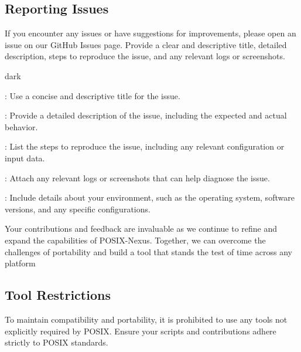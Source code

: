 \subsection{Reporting Issues}
\label{sec:start:sub:report}
If you encounter any issues or have suggestions for improvements, please open an issue on our GitHub Issues page.
Provide a clear and descriptive title, detailed description, steps to reproduce the issue, and any relevant logs or screenshots.
\bigskip
\begin{baseBoxOne}{}{dark}
    \begin{posnexItemize}
        \item[\sA] : Use a concise and descriptive title for the issue.
        \item[\sA] : Provide a detailed description of the issue, including the expected and actual behavior.
        \item[\sA] : List the steps to reproduce the issue, including any relevant configuration or input data.
        \item[\sA] : Attach any relevant logs or screenshots that can help diagnose the issue.
        \item[\sA] : Include details about your environment, such as the operating system, software versions, and any specific configurations.
    \end{posnexItemize}
\end{baseBoxOne}
\bigskip
Your contributions and feedback are invaluable as we continue to refine and expand the capabilities of POSIX-Nexus.
Together, we can overcome the challenges of portability and build a tool that stands the test of time across any platform

\subsection{Tool Restrictions}
\label{sec:start:sub:restrict}
To maintain compatibility and portability, it is prohibited to use any tools not explicitly required by POSIX.
Ensure your scripts and contributions adhere strictly to POSIX standards.


